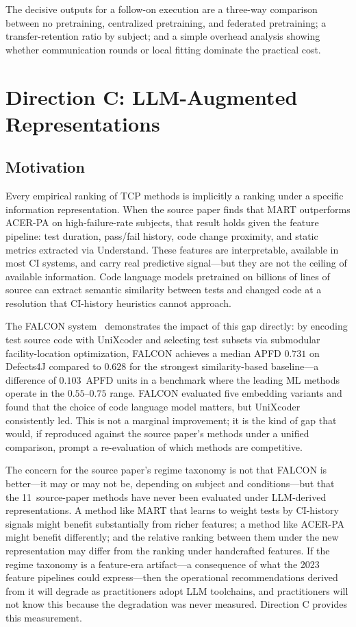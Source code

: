 \documentclass[10pt,conference]{IEEEtran}
\begin{document}
The decisive outputs for a follow-on execution are a three-way comparison between no pretraining, centralized pretraining, and federated pretraining; a transfer-retention ratio by subject; and a simple overhead analysis showing whether communication rounds or local fitting dominate the practical cost.

\section{Direction C: LLM-Augmented Representations}\label{sec:direction_c}

\subsection{Motivation}

Every empirical ranking of TCP methods is implicitly a ranking under a specific information representation. When the source paper finds that MART outperforms ACER-PA on high-failure-rate subjects, that result holds given the feature pipeline: test duration, pass/fail history, code change proximity, and static metrics extracted via Understand. These features are interpretable, available in most CI systems, and carry real predictive signal---but they are not the ceiling of available information. Code language models pretrained on billions of lines of source can extract semantic similarity between tests and changed code at a resolution that CI-history heuristics cannot approach.

The FALCON system~\cite{falcon} demonstrates the impact of this gap directly: by encoding test source code with UniXcoder and selecting test subsets via submodular facility-location optimization, FALCON achieves a median APFD $0.731$ on Defects4J compared to $0.628$ for the strongest similarity-based baseline---a difference of $0.103$~APFD units in a benchmark where the leading ML methods operate in the $0.55$--$0.75$ range. FALCON evaluated five embedding variants and found that the choice of code language model matters, but UniXcoder consistently led. This is not a marginal improvement; it is the kind of gap that would, if reproduced against the source paper's methods under a unified comparison, prompt a re-evaluation of which methods are competitive.

The concern for the source paper's regime taxonomy is not that FALCON is better---it may or may not be, depending on subject and conditions---but that the 11~source-paper methods have never been evaluated under LLM-derived representations. A method like MART that learns to weight tests by CI-history signals might benefit substantially from richer features; a method like ACER-PA might benefit differently; and the relative ranking between them under the new representation may differ from the ranking under handcrafted features. If the regime taxonomy is a feature-era artifact---a consequence of what the 2023 feature pipelines could express---then the operational recommendations derived from it will degrade as practitioners adopt LLM toolchains, and practitioners will not know this because the degradation was never measured. Direction C provides this measurement.
\end{document}
